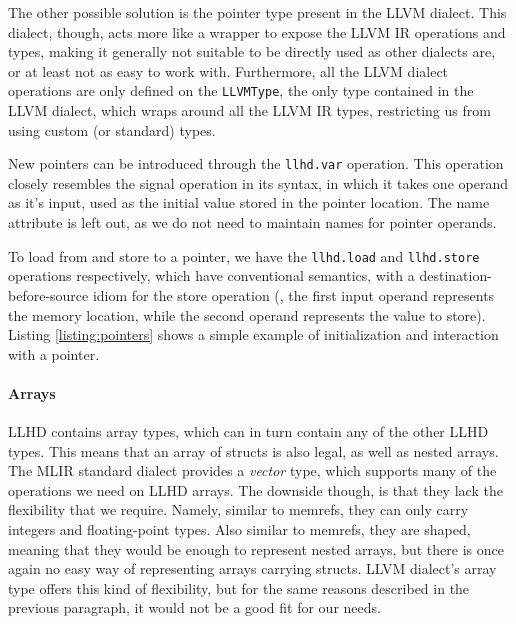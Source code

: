 The other possible solution is the pointer type present in the LLVM dialect. This dialect, though, acts more like a wrapper to expose the LLVM IR operations and types, making it generally not suitable to be directly used as other dialects are, or at least not as easy to work with. Furthermore, all the LLVM dialect operations are only defined on the \texttt{LLVMType}, the only type contained in the LLVM dialect, which wraps around all the LLVM IR types, restricting us from using custom (or standard) types.

New pointers can be introduced through the \texttt{llhd.var} operation. This operation closely resembles the signal operation in its syntax, in which it takes one operand as it's input, used as the initial value stored in the pointer location. The name attribute is left out, as we do not need to maintain names for pointer operands.

To load from and store to a pointer, we have the \texttt{llhd.load} and \texttt{llhd.store} operations respectively, which have conventional semantics, with a destination-before-source idiom for the store operation (\ie, the first input operand represents the memory location, while the second operand represents the value to store). Listing \ref{listing:pointers} shows a simple example of initialization and interaction with a pointer.


\paragraph{Arrays}
LLHD contains array types, which can in turn contain any of the other LLHD types. This means that an array of structs is also legal, as well as nested arrays. The MLIR standard dialect provides a \textit{vector} type, which supports many of the operations we need on LLHD arrays. The downside though, is that they lack the flexibility that we require. Namely, similar to memrefs, they can only carry integers and floating-point types. Also similar to memrefs, they are shaped, meaning that they would be enough to represent nested arrays, but there is once again no easy way of representing arrays carrying structs. LLVM dialect's array type offers this kind of flexibility, but for the same reasons described in the previous paragraph, it would not be a good fit for our needs.

